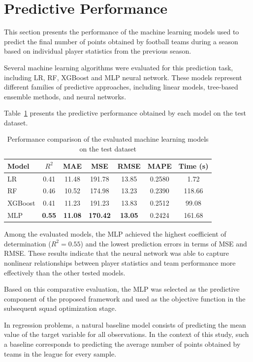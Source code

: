 \documentclass[12pt]{article}
\begin{document}
\section{Predictive Performance}

This section presents the performance of the machine learning models used to predict the final number of points obtained by football teams during a season
based on individual player statistics from the previous season.

Several machine learning algorithms were evaluated for this prediction task, including LR, RF, XGBoost and MLP neural network. 
These models represent different families of predictive approaches, including linear models, tree-based ensemble methods, and neural networks.

Table~\ref{tab:model_comparison} presents the predictive performance obtained by each model on the test dataset.

\begin{table}[htbp]
\centering
\caption{Performance comparison of the evaluated machine learning models on the test dataset}
\label{tab:model_comparison}
\begin{tabular}{lcccccc}
\hline
Model & $R^2$ & MAE & MSE & RMSE & MAPE & Time (s) \\
\hline
LR & 0.41 & 11.48 & 191.78 & 13.85 & 0.2580 & 1.72 \\
RF & 0.46 & 10.52 & 174.98 & 13.23 & 0.2390 & 118.66 \\
XGBoost & 0.41 & 11.23 & 191.23 & 13.83 & 0.2512 & 99.08 \\
MLP & \textbf{0.55} & \textbf{11.08} & \textbf{170.42} & \textbf{13.05} & 0.2424 & 161.68 \\
\hline
\end{tabular}
\end{table}

Among the evaluated models, the MLP achieved the highest coefficient of determination ($R^2 = 0.55$) and the lowest prediction errors in terms of MSE and RMSE.
These results indicate that the neural network was able to capture nonlinear relationships between player statistics and team performance more effectively
than the other tested models.

Based on this comparative evaluation, the MLP was selected as the predictive component of the proposed framework and used as the objective function in the
subsequent squad optimization stage.

In regression problems, a natural baseline model consists of predicting the mean value of the target variable for all observations. In the context of this
study, such a baseline corresponds to predicting the average number of points obtained by teams in the league for every sample.
\end{document}
